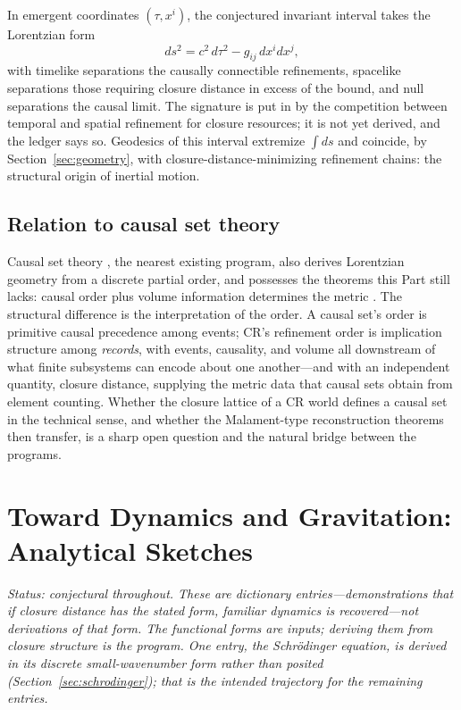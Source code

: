 \documentclass[11pt]{article}
\theoremstyle{definition}
\theoremstyle{remark}
\begin{document}
In emergent coordinates $(\tau, x^i)$, the conjectured invariant interval takes the Lorentzian form
\[ ds^2 = c^2\, d\tau^2 - g_{ij}\, dx^i dx^j , \]
with timelike separations the causally connectible refinements, spacelike separations those requiring closure distance in excess of the bound, and null separations the causal limit. The signature is put in by the competition between temporal and spatial refinement for closure resources; it is not yet derived, and the ledger says so. Geodesics of this interval extremize $\int ds$ and coincide, by Section~\ref{sec:geometry}, with closure-distance-minimizing refinement chains: the structural origin of inertial motion.

\subsection{Relation to causal set theory}
Causal set theory \cite{BLMS1987}, the nearest existing program, also derives Lorentzian geometry from a discrete partial order, and possesses the theorems this Part still lacks: causal order plus volume information determines the metric \cite{Malament1977,HKM1976}. The structural difference is the interpretation of the order. A causal set's order is primitive causal precedence among events; CR's refinement order is implication structure among \emph{records}, with events, causality, and volume all downstream of what finite subsystems can encode about one another---and with an independent quantity, closure distance, supplying the metric data that causal sets obtain from element counting. Whether the closure lattice of a CR world defines a causal set in the technical sense, and whether the Malament-type reconstruction theorems then transfer, is a sharp open question and the natural bridge between the programs.

\section{Toward Dynamics and Gravitation: Analytical Sketches}\label{sec:dynamics}
\emph{Status: conjectural throughout. These are dictionary entries---demonstrations that if closure distance has the stated form, familiar dynamics is recovered---not derivations of that form. The functional forms are inputs; deriving them from closure structure is the program. One entry, the Schr\"odinger equation, is derived in its discrete small-wavenumber form rather than posited (Section~\ref{sec:schrodinger}); that is the intended trajectory for the remaining entries.}
\end{document}
